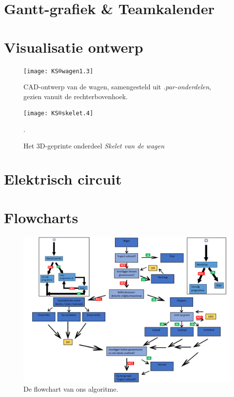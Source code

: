 \documentclass[a4paper,twoside,kulak]{kulakreport}
\begin{document}
	
	\section{Gantt-grafiek \& Teamkalender}
	\label{sec: kale}
	
	
	
	
	
	
	
	
	
	
	\section{Visualisatie ontwerp}
	\label{sec: vis}
	
\begin{figure}[h]
		\centering
		\texttt{[image: KS®wagen1.3]}
	\caption{CAD-ontwerp van de wagen, samengesteld uit \textit{.par-onderdelen}, gezien vanuit de rechterbovenhoek.}
		\label{fig: wagen}
\end{figure}

\begin{figure}[h]
	\centering
	\texttt{[image: KS®skelet.4]}
	\caption{Het 3D-geprinte onderdeel \textit{Skelet van de wagen} }.
	\label{fig: skelet}
\end{figure}

\section{Elektrisch circuit}
\label{sec: circ}

\section{Flowcharts}
\label{sec: flowchart}

\begin{figure}
	\centering
	\includegraphics[width=1.3\textwidth]{fchart}
	\caption{De flowchart van ons algoritme. 
	}
	\label{fig: fchart}
	
\end{figure}
\end{document}
